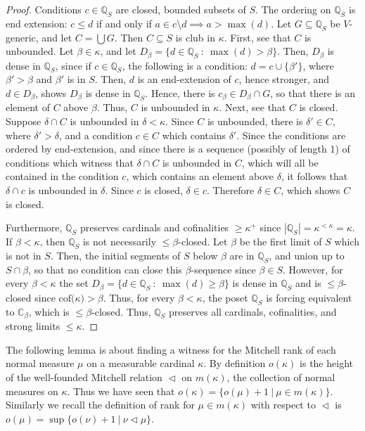 \documentclass[10pt,leqno]{amsart}
\begin{document}
\begin{proof} Conditions $c \in \mathbb{Q}_S$ are closed, bounded subsets of $S$. The ordering on $\mathbb{Q}_S$ is end extension: $c \le d$ if and only if $a \in c \setminus d \implies a > \max(d)$. Let $G \subseteq \mathbb{Q}_S$ be $V$-generic, and let $C = \bigcup G$. Then $C \subseteq S$ is club in $\kappa$. First, see that $C$ is unbounded. Let $\beta \in \kappa$, and let $D_{\beta} = \{ d \in \mathbb{Q}_S \ : \ \max(d) > \beta\}$. Then, $D_{\beta}$ is dense in $\mathbb{Q}_S$, since if $c \in \mathbb{Q}_S$, the following is a condition: $d = c \cup \{\beta'\}$, where $\beta' > \beta$ and $\beta'$ is in $S$. Then, $d$ is an end-extension of $c$, hence stronger, and $d \in D_{\beta}$, shows $D_{\beta}$ is dense in $\mathbb{Q}_S$. Hence, there is $c_{\beta} \in D_{\beta} \cap G$, so that there is an element of $C$ above $\beta$. Thus, $C$ is unbounded in $\kappa$. Next, see that $C$ is closed. Suppose $\delta \cap C$ is unbounded in $\delta < \kappa$. Since $C$ is unbounded, there is $\delta' \in C$, where $\delta' > \delta$, and a condition $c \in C$ which contains $\delta'$. Since the conditions are ordered by end-extension, and since there is a sequence (possibly of length 1) of conditions which witness that $\delta \cap C$ is unbounded in $C$, which will all be contained in the condition $c$, which contains an element above $\delta$, it follows that $\delta \cap c$ is unbounded in $\delta$. Since $c$ is closed, $\delta \in c$. Therefore $\delta \in C$, which shows $C$ is closed.

Furthermore, $\mathbb{Q}_S$ preserves cardinals and cofinalities $\ge \kappa^+$ since $|\mathbb{Q}_S| = \kappa^{< \kappa} = \kappa$. If $\beta < \kappa$, then $\mathbb{Q}_S$ is not necessarily $\le \beta$-closed. Let $\beta$ be the first limit of $S$ which is not in $S$. Then, the initial segments of $S$ below $\beta$ are in $\mathbb{Q}_S$, and union up to $S \cap \beta$, so that no condition can close this $\beta$-sequence since $\beta \in S$. However, for every $\beta < \kappa$ the set $D_{\beta} = \{ d \in \mathbb{Q}_S \ : \ \max(d) \ge \beta \}$ is dense in $\mathbb{Q}_S$ and is $\le \beta$-closed since $\mbox{cof($\kappa$)} > \beta$. Thus, for every $\beta < \kappa$, the poset $\mathbb{Q}_S$ is forcing equivalent to $\mathbb{C}_{\beta}$, which is $\le \beta$-closed. Thus, $\mathbb{Q}_S$ preserves all cardinals, cofinalities, and strong limits $\le \kappa$.
\end{proof}

The following lemma is about finding a witness for the Mitchell rank of each normal measure $\mu$ on a measurable cardinal $\kappa$. By definition $o(\kappa)$ is the height of the well-founded Mitchell relation $\vartriangleleft$ on $m(\kappa)$, the collection of normal measures on $\kappa$. Thus we have seen that $o(\kappa) = \{ o(\mu) + 1 \ | \ \mu \in m(\kappa)\}$. Similarly we recall the definition of rank for $\mu \in m(\kappa)$ with respect to $\vartriangleleft$ is $o(\mu) = \sup\{o(\nu) + 1 \ | \ \nu \vartriangleleft \mu \}$.
\end{document}
